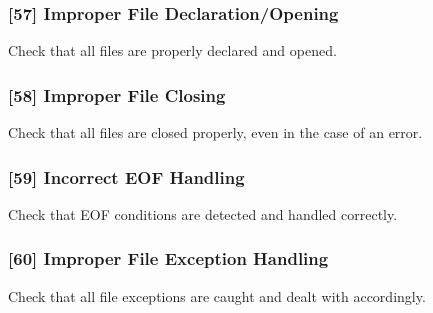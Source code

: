 \subsubsection{[57] Improper File Declaration/Opening}
Check that all files are properly declared and opened.
\subsubsection{[58] Improper File Closing}
Check that all files are closed properly, even in the case of an error.
\subsubsection{[59] Incorrect EOF Handling}
Check that EOF conditions are detected and handled correctly.
\subsubsection{[60] Improper File Exception Handling}
Check that all file exceptions are caught and dealt with accordingly.